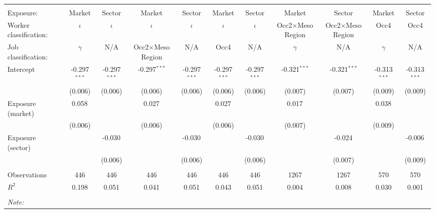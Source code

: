 \begin{tabular}{@{\extracolsep{5pt}}lcccccccccc}
\\[-1.8ex]\hline
\hline \\[-1.8ex]
\hline \\[-1.8ex]
 Exposure: & Market & Sector & Market & Sector & Market & Sector & Market & Sector & Market & Sector \\
 Worker classification: & $\iota$ & $\iota$ & $\iota$ & $\iota$ & $\iota$ & $\iota$ & Occ2$\times$Meso Region & Occ2$\times$Meso Region & Occ4 & Occ4 \\
 Job classification: & $\gamma$ & N/A & Occ2$\times$Meso Region & N/A & Occ4 & N/A & $\gamma$ & N/A & $\gamma$ & N/A \\
 Intercept & -0.297$^{***}$ & -0.297$^{***}$ & -0.297$^{***}$ & -0.297$^{***}$ & -0.297$^{***}$ & -0.297$^{***}$ & -0.321$^{***}$ & -0.321$^{***}$ & -0.313$^{***}$ & -0.313$^{***}$ \\
& (0.006) & (0.006) & (0.006) & (0.006) & (0.006) & (0.006) & (0.007) & (0.007) & (0.009) & (0.009) \\
 Exposure (market) & 0.058$^{}$ & & 0.027$^{}$ & & 0.027$^{}$ & & 0.017$^{}$ & & 0.038$^{}$ & \\
& (0.006) & & (0.006) & & (0.006) & & (0.007) & & (0.009) & \\
 Exposure (sector) & & -0.030$^{}$ & & -0.030$^{}$ & & -0.030$^{}$ & & -0.024$^{}$ & & -0.006$^{}$ \\
& & (0.006) & & (0.006) & & (0.006) & & (0.007) & & (0.009) \\
\hline \\[-1.8ex]
 Observations & 446 & 446 & 446 & 446 & 446 & 446 & 1267 & 1267 & 570 & 570 \\
 $R^2$ & 0.198 & 0.051 & 0.041 & 0.051 & 0.043 & 0.051 & 0.004 & 0.008 & 0.030 & 0.001 \\
\hline
\hline \\[-1.8ex]
\textit{Note:}\end{tabular}